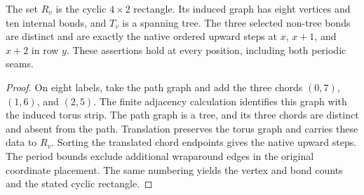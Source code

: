 \begin{lemma}%
    \label{thm:peps_three_plaquette_geometry}
    \leanok
    The set $R_v$ is the cyclic $4\times2$ rectangle. Its induced
    graph has eight vertices and ten internal bonds, and $T_v$ is a spanning
    tree. The three selected non-tree bonds are distinct and are exactly
    the native ordered upward steps at $x$, $x+1$, and $x+2$ in row $y$.
    These assertions hold at every position, including both periodic seams.
\end{lemma}

\begin{proof}\leanok
    On eight labels, take the path graph and add the three chords
    $(0,7)$, $(1,6)$, and $(2,5)$. The finite adjacency calculation identifies
    this graph with the induced torus strip. The path graph is a tree,
    and its three chords are distinct and absent from the path.
    Translation preserves the torus graph and carries these data to $R_v$.
    Sorting the translated chord endpoints gives the native upward steps.
    The period bounds exclude additional wraparound edges in the original
    coordinate placement. The same numbering yields the vertex and bond
    counts and the stated cyclic rectangle.
\end{proof}
